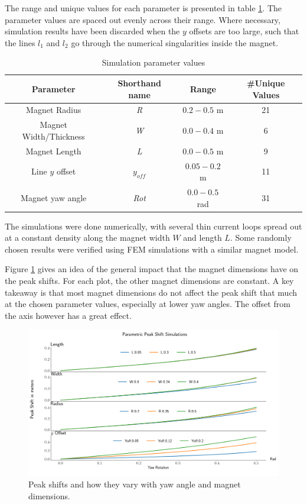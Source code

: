 The range and unique values for each parameter is presented in table \ref{tab:parameter-vals}.
The parameter values are spaced out evenly across their range. Where necessary, simulation
results have been discarded when the $y$ offsets are too large, such that the lines $l_1$
and $l_2$ go through the numerical singularities inside the magnet.

\begin{table}[h!]
    \begin{center}
        \begin{tabular}{c c c c}
            Parameter              & Shorthand name & Range         & \#Unique Values \\
            \hline
            Magnet Radius          & \emph{R}       & $0.2-0.5$ m   & 21              \\
            Magnet Width/Thickness & \emph{W}       & $0.0-0.4$ m   & 6               \\
            Magnet Length          & \emph{L}       & $0.0-0.5$ m   & 9               \\
            Line $y$ offset        & $y_{off}$      & $0.05-0.2$ m  & 11              \\
            Magnet yaw angle       & \emph{Rot}     & $0.0-0.5$ rad & 31
        \end{tabular}
        \caption{Simulation parameter values}
        \label{tab:parameter-vals}
    \end{center}
\end{table}

The simulations were done numerically, with several thin
current loops spread out at a constant density along the magnet
width $W$ and length $L$. Some randomly chosen results were
verified using FEM simulations with a similar magnet model.

Figure \ref{fig:sim-mag-dimensions} gives an idea of the general impact that the
magnet dimensions have on the peak shifts. For each plot, the other magnet dimensions
are constant. A key takeaway is that most magnet dimensions do not affect
the peak shift that much at the chosen parameter values, especially at 
lower yaw angles. The offset from the axis however has a great effect.


\begin{figure}
    \centering
    \includegraphics[width=\linewidth]{figs/sim_params_plot}
    \caption{Peak shifts and how they vary with yaw angle and magnet dimensions.}
    \label{fig:sim-mag-dimensions}
\end{figure}

